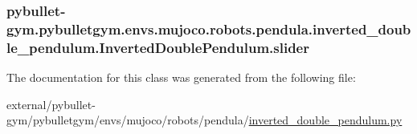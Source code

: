 \subsubsection[{\texorpdfstring{slider}{slider}}]{\setlength{\rightskip}{0pt plus 5cm}pybullet-\/gym.\+pybulletgym.\+envs.\+mujoco.\+robots.\+pendula.\+inverted\+\_\+double\+\_\+pendulum.\+Inverted\+Double\+Pendulum.\+slider}\hypertarget{classpybullet-gym_1_1pybulletgym_1_1envs_1_1mujoco_1_1robots_1_1pendula_1_1inverted__double__penb7cabeef1e6b20f22de17739c38bbed3_a0418c60ebbb12df4d363b3c5f4d933e7}{}\label{classpybullet-gym_1_1pybulletgym_1_1envs_1_1mujoco_1_1robots_1_1pendula_1_1inverted__double__penb7cabeef1e6b20f22de17739c38bbed3_a0418c60ebbb12df4d363b3c5f4d933e7}


The documentation for this class was generated from the following file\+:\begin{DoxyCompactItemize}
\item 
external/pybullet-\/gym/pybulletgym/envs/mujoco/robots/pendula/\hyperlink{mujoco_2robots_2pendula_2inverted__double__pendulum_8py}{inverted\+\_\+double\+\_\+pendulum.\+py}\end{DoxyCompactItemize}
